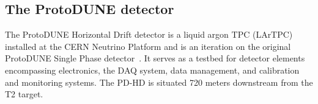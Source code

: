 


\subsection{The ProtoDUNE detector} \label{chap:protodune_det}

The ProtoDUNE Horizontal Drift detector is a liquid argon TPC (LArTPC) installed at the CERN Neutrino Platform and is an iteration on the original ProtoDUNE Single Phase detector~\cite{ProtoDUNESP_2020}. %
It serves as a testbed for detector elements encompassing electronics, the DAQ system, data management, and calibration and monitoring systems. The PD-HD is situated 720 meters downstream from the T2 target.

